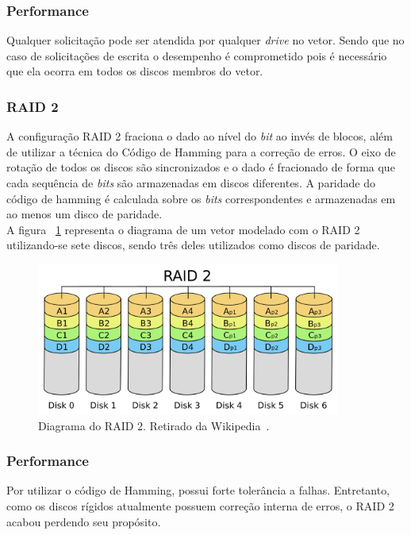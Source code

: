 		\subsubsection{Performance}
		
		Qualquer solicitação pode ser atendida por qualquer \textit{drive} no vetor. Sendo que no caso de solicitações de escrita o desempenho é comprometido pois é necessário que ela ocorra em todos os discos membros do vetor. \\
		
		\subsubsection{RAID 2}
		
		A configuração RAID 2 fraciona o dado ao nível do \textit{bit} ao invés de blocos, além de utilizar a técnica do Código de Hamming para a correção de erros. O eixo de rotação de todos os discos são sincronizados e o dado é fracionado de forma que cada sequência de \textit{bits} são armazenadas em discos diferentes. A paridade do código de hamming é calculada sobre os \textit{bits} correspondentes e armazenadas em ao menos um disco de paridade.\\
		
		A figura ~\ref{fig:raid2} representa o diagrama de um vetor modelado com o RAID 2 utilizando-se sete discos, sendo três deles utilizados como discos de paridade.\\
		
		\begin{figure}[htb]
			\begin{center}
				
				\includegraphics[clip,width=10.0cm]{images/RAID_2.png}
				\caption{Diagrama do RAID 2. Retirado da Wikipedia~\citep{wikiRAIDlevels}.}
				\label{fig:raid2}
			\end{center}
		\end{figure} 
		
		\subsubsection{Performance}
		Por utilizar o código de Hamming, possui forte tolerância a falhas. Entretanto, como os discos rígidos atualmente possuem correção interna de erros, o RAID 2 acabou perdendo seu propósito. 
	
